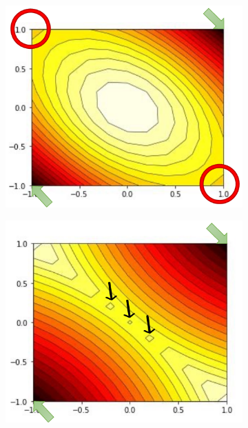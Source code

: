 \begin{figure}[t]
    \centering
    \begin{subfigure}{.22\textwidth}
    \centering
    \includegraphics[width=\linewidth]{chapter-1/images/LS1.pdf}  
    \caption{}
\end{subfigure}
\begin{subfigure}{.22\textwidth}
    \centering
    \includegraphics[width=\linewidth]{chapter-1/images/LS2.pdf}  
    \caption{}

\end{subfigure}
\end{figure}
